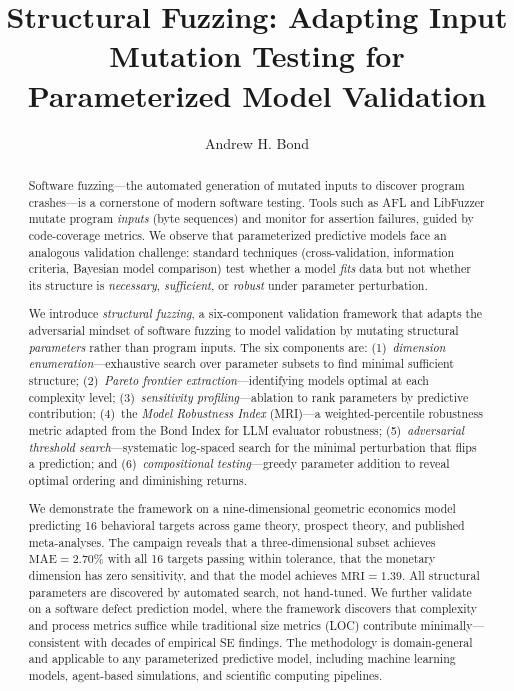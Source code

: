 \documentclass[manuscript,review,anonymous]{acmart}
\title{Structural Fuzzing: Adapting Input Mutation Testing for Parameterized Model Validation}
\author{Andrew H. Bond}
\affiliation{%
  \institution{San Jos\'{e} State University}
  \department{Department of Computer Engineering}
  \city{San Jos\'{e}}
  \state{California}
  \country{USA}
}
\newcommand{\MAE}{\mathrm{MAE}}
\newcommand{\MRI}{\mathrm{MRI}}
\begin{document}
\begin{abstract}
Software fuzzing---the automated generation of mutated inputs to discover program crashes---is a cornerstone of modern software testing.
Tools such as AFL and LibFuzzer mutate program \emph{inputs} (byte sequences) and monitor for assertion failures, guided by code-coverage metrics.
We observe that parameterized predictive models face an analogous validation challenge: standard techniques (cross-validation, information criteria, Bayesian model comparison) test whether a model \emph{fits} data but not whether its structure is \emph{necessary}, \emph{sufficient}, or \emph{robust} under parameter perturbation.

We introduce \emph{structural fuzzing}, a six-component validation framework that adapts the adversarial mindset of software fuzzing to model validation by mutating structural \emph{parameters} rather than program inputs.
The six components are:
(1)~\emph{dimension enumeration}---exhaustive search over parameter subsets to find minimal sufficient structure;
(2)~\emph{Pareto frontier extraction}---identifying models optimal at each complexity level;
(3)~\emph{sensitivity profiling}---ablation to rank parameters by predictive contribution;
(4)~the \emph{Model Robustness Index} (MRI)---a weighted-percentile robustness metric adapted from the Bond Index for LLM evaluator robustness;
(5)~\emph{adversarial threshold search}---systematic log-spaced search for the minimal perturbation that flips a prediction; and
(6)~\emph{compositional testing}---greedy parameter addition to reveal optimal ordering and diminishing returns.

We demonstrate the framework on a nine-dimensional geometric economics model predicting 16 behavioral targets across game theory, prospect theory, and published meta-analyses.
The campaign reveals that a three-dimensional subset achieves $\MAE = 2.70\%$ with all 16 targets passing within tolerance, that the monetary dimension has zero sensitivity, and that the model achieves $\MRI = 1.39$.
All structural parameters are discovered by automated search, not hand-tuned.
We further validate on a software defect prediction model, where the framework discovers that complexity and process metrics suffice while traditional size metrics (LOC) contribute minimally---consistent with decades of empirical SE findings.
The methodology is domain-general and applicable to any parameterized predictive model, including machine learning models, agent-based simulations, and scientific computing pipelines.
\end{abstract}
\end{document}
